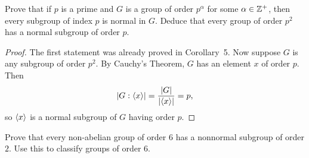  Prove that if $p$ is a prime and $G$ is a group of order
$p^\alpha$ for some $\alpha\in\mathbb{Z}^+$, then every subgroup of index $p$
is normal in $G$. Deduce that every group of order $p^2$ has a normal
subgroup of order $p$.
\begin{proof}
  The first statement was already proved in Corollary~5. Now suppose
  $G$ is any subgroup of order $p^2$. By Cauchy's Theorem, $G$ has an
  element $x$ of order $p$. Then
  \begin{equation*}
    \lvert{G:\langle{x}\rangle}\rvert = \frac{\lvert{G}\rvert}{\lvert{\langle{x}\rangle}\rvert} = p,
  \end{equation*}
  so $\langle{x}\rangle$ is a normal subgroup of $G$ having order $p$.
\end{proof}

 Prove that every non-abelian group of order $6$ has a
nonnormal subgroup of order $2$. Use this to classify groups of order
$6$.
